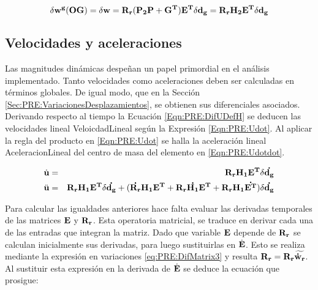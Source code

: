  \begin{equation}\label{Eqn:PRE:AngularBaricentro}
 	\delta \bf{w^g} (OG) =\delta \bf{w} =\bf{R}_r (\bf{P}_2\bf{P}+\bf{G}^T)\bf{E}^T\delta \bf{d}_g = \bf{R}_r\bf{H}_2\bf{E}^T \delta \bf{d}_g
 \end{equation}



\subsection{Velocidades y aceleraciones}\label{Sec:PRE:VelAc}

Las magnitudes dinámicas despeñan un papel primordial en el análisis implementado. Tanto velocidades como aceleraciones deben ser calculadas en términos globales. De igual modo, que en la Sección \ref{Sec:PRE:VariacionesDesplazamientos}, se obtienen sus diferenciales asociados. Derivando respecto al tiempo la Ecuación \eqref{Eqn:PRE:DifUDefH} se deducen las velocidades lineal \gls{VeloicdadLineal} según la Expresión \eqref{Eqn:PRE:Udot}. Al aplicar la regla del producto en \eqref{Eqn:PRE:Udot} se halla la aceleración lineal \gls{AceleracionLineal} del centro de masa del elemento en \eqref{Eqn:PRE:Udotdot}.

 \begin{eqnarray}
 	\label{Eqn:PRE:Udot}
	\dot{\bf{u}} &=&\bf{R}_r \bf{H}_1 \bf{E}^T \delta \dot{ \bf{d}_g }\\
	\label{Eqn:PRE:Udotdot}
	\ddot{\bf{u}}& = &\bf{R}_r \bf{H}_1 \bf{E}^T \delta \dot{ \bf{d}_g }+ (\dot{\bf{R}_r} \bf{H}_1 \bf{E}^T+\bf{R}_r \dot{\bf{H}_1} \bf{E}^T+\bf{R}_r \bf{H}_1 \dot{\bf{E}^T})\delta \dot{ \bf{d}_g }
\end{eqnarray}

Para calcular las igualdades anteriores hace falta evaluar las derivadas temporales de las matrices $\bf{E}$ y $\bf{R}_r$. Esta operatoria matricial, se traduce en derivar cada una de las entradas que integran la matriz. Dado que variable $\bf{E}$ depende de $\bf{R}_r$ se calculan inicialmente sus derivadas, para luego sustituirlas en $\dot{\bf{E}}$. Esto se realiza mediante la expresión en variaciones \eqref{eq:PRE:DifMatrix3} y resulta $\bf{R}_r=\bf{R_r}\widetilde{\dot{\bf{w}}_r}$. Al sustituir esta expresión en la derivada de $\dot{\bf{E}}$ se deduce la ecuación que prosigue:

